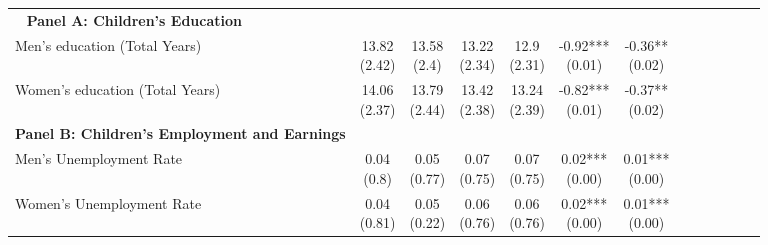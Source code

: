 \begin{landscape}
\begin{ThreePartTable}
\begin{longtable}[t]{>{\raggedright\arraybackslash}p{5cm}cccccc}
\midrule
\endhead
\midrule
\multicolumn{7}{r@{}}{\textit{(Continued on Next Page...)}}\
\endfoot
\bottomrule
\insertTableNotes
\endlastfoot
\textbf{Panel A: Children's Education} & \textbf{} & \textbf{} & \textbf{} & \textbf{} & \textbf{} & \textbf{}\\
\hspace{1em}Men’s education (Total Years) & \specialcell{13.82\\(2.42)} & \specialcell{13.58\\(2.4)} & \specialcell{13.22\\(2.34)} & \specialcell{12.9\\(2.31)} & \specialcell{-0.92***\\(0.01)} & \specialcell{-0.36**\\(0.02)}\\
\hspace{1em}Women’s education (Total Years) & \specialcell{14.06\\(2.37)} & \specialcell{13.79\\(2.44)} & \specialcell{13.42\\(2.38)} & \specialcell{13.24\\(2.39)} & \specialcell{-0.82***\\(0.01)} & \specialcell{-0.37**\\(0.02)}\\
\textbf{Panel B: Children's Employment and Earnings} & \textbf{} & \textbf{} & \textbf{} & \textbf{} & \textbf{} & \textbf{}\\
\hspace{1em}Men’s Unemployment Rate & \specialcell{0.04\\(0.8)} & \specialcell{0.05\\(0.77)} & \specialcell{0.07\\(0.75)} & \specialcell{0.07\\(0.75)} & \specialcell{0.02***\\(0.00)} & \specialcell{0.01***\\(0.00)}\\
\addlinespace
\hspace{1em}Women’s Unemployment Rate & \specialcell{0.04\\(0.81)} & \specialcell{0.05\\(0.22)} & \specialcell{0.06\\(0.76)} & \specialcell{0.06\\(0.76)} & \specialcell{0.02***\\(0.00)} & \specialcell{0.01***\\(0.00)}\\

\end{longtable}
\end{ThreePartTable}
\end{landscape}
